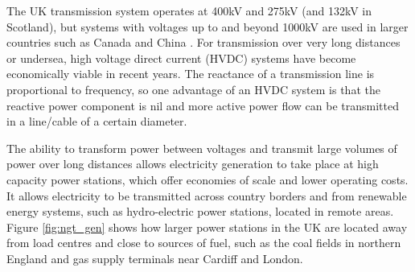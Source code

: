 The UK transmission system operates at 400kV and 275kV (and 132kV in Scotland),
but systems with voltages up to and beyond 1000kV are used in larger countries
such as Canada and China \cite{eletra:1000kV}.  For transmission over very long
distances or undersea, high voltage direct current (HVDC) systems have become
economically viable in recent years.  The reactance of a transmission line is
proportional to frequency, so one advantage of an HVDC system is that the
reactive power component is nil and more active power flow can be
transmitted in a line/cable of a certain diameter.

The ability to transform power between voltages and transmit large volumes
of power over long distances allows electricity generation to take place at high
capacity power stations, which offer economies of scale and lower operating costs. It
allows electricity to be transmitted across country borders and from renewable
energy systems, such as hydro-electric power stations, located in remote areas.
Figure \ref{fig:ngt_gen} shows how larger power stations in the UK are located
away from load centres and close to sources of fuel, such as the coal fields
in northern England and gas supply terminals near Cardiff and London.

